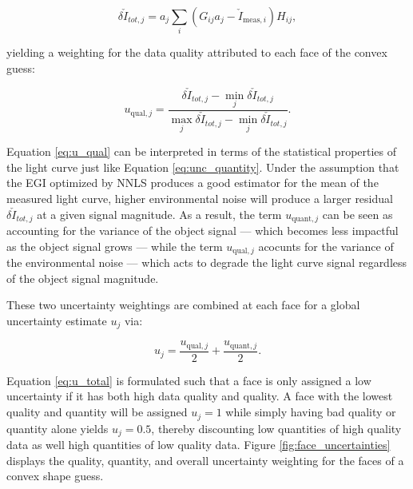 \begin{equation}
  \delta \check{I}_{tot,j} = a_j \sum_{i}{\left( G_{ij} a_j - \check{I}_{\mathrm{meas},i} \right) H_{ij}},
\end{equation}

yielding a weighting for the data quality attributed to each face of the convex guess:

\begin{equation} \label{eq:u_qual}
  u_{\mathrm{qual},j} = \frac{\delta \check{I}_{tot,j} - \min_{j}{\delta \check{I}_{tot,j}}}{\max_{j}{\delta \check{I}_{tot,j}} - \min_{j}{\delta \check{I}_{tot,j}}}.
\end{equation}

Equation \ref{eq:u_qual} can be interpreted in terms of the statistical properties of the light curve just like Equation \ref{eq:unc_quantity}. Under the assumption that the EGI optimized by NNLS produces a good estimator for the mean of the measured light curve, higher environmental noise will produce a larger residual $\delta \check{I}_{tot,j}$ at a given signal magnitude. As a result, the term $u_{\mathrm{quant},j}$ can be seen as accounting for the variance of the object signal --- which becomes less impactful as the object signal grows --- while the term $u_{\mathrm{qual},j}$ acocunts for the variance of the environmental noise --- which acts to degrade the light curve signal regardless of the object signal magnitude.

These two uncertainty weightings are combined at each face for a global uncertainty estimate $u_j$ via:

\begin{equation} \label{eq:u_total}
  u_j = \frac{u_{\mathrm{qual},j}}{2} + \frac{u_{\mathrm{quant},j}}{2}.
\end{equation}

Equation \ref{eq:u_total} is formulated such that a face is only assigned a low uncertainty if it has both high data quality and quality. A face with the lowest quality and quantity will be assigned $u_j = 1$ while simply having bad quality or quantity alone yields $u_j = 0.5$, thereby discounting low quantities of high quality data as well high quantities of low quality data. Figure \ref{fig:face_uncertainties} displays the quality, quantity, and overall uncertainty weighting for the faces of a convex shape guess.

